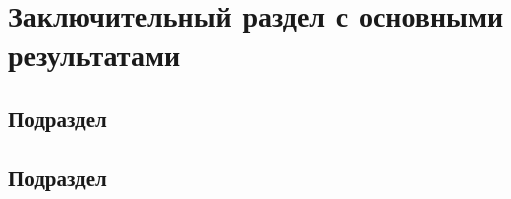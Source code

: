 

\section{Заключительный раздел с основными результатами}

\subsection{Подраздел}



\subsection{Подраздел}

